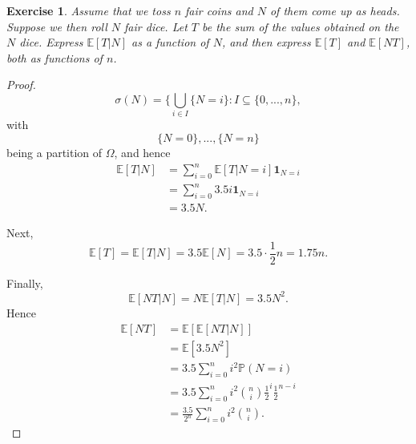 \documentclass{article}
\newtheorem{exercise}[theorem]{Exercise}
\begin{document}
\begin{exercise}
Assume that we toss $n$ fair coins and $N$ of them come up as heads. Suppose we then roll $N$ fair dice. Let $T$ be the sum of the values obtained on the $N$ dice. Express $\mathbb{E}[T|N]$ as a function of $N$, and then express $\mathbb{E}[T]$ and $\mathbb{E}[NT]$, both as functions of $n$.
\end{exercise}
\begin{proof}
\[\sigma(N)=\{\bigcup_{i\in I}\{N=i\}:I\subseteq\{0,...,n\},\] with \[\{N=0\},...,\{N=n\}\] being a partition of $\Omega$, and hence\begin{align*}\mathbb{E}[T|N]&=\sum_{i=0}^n\mathbb{E}[T|N=i]\mathbf{1}_{N=i}\\&=\sum_{i=0}^n3.5i\mathbf{1}_{N=i}\\&=3.5N.\end{align*}

Next,\[\mathbb{E}[T]=\mathbb{E}[T|N]=3.5\mathbb{E}[N]=3.5\cdot\frac{1}{2}n=1.75n.\]

Finally, \[\mathbb{E}[NT|N]=N\mathbb{E}[T|N]=3.5N^2.\] Hence\begin{align*}\mathbb{E}[NT]&=\mathbb{E}[\mathbb{E}[NT|N]]\\&=\mathbb{E}[3.5N^2]\\&=3.5\sum_{i=0}^ni^2\mathbb{P}(N=i)\\&=3.5\sum_{i=0}^ni^2{{n}\choose{i}}\frac{1}{2}^i\frac{1}{2}^{n-i}\\&=\frac{3.5}{2^n}\sum_{i=0}^ni^2{{n}\choose{i}}.\end{align*}
\end{proof}
\end{document}
